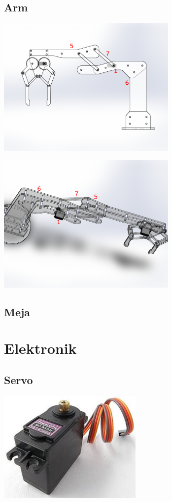 \documentclass[11pt,fleqn]{book} %
\begin{document}
\section{Arm}
\begin{center}
 \includegraphics[width=250pt]{./screenshot/arm/GAF}\\
\end{center}
\begin{center}
 \includegraphics[width=250pt]{./screenshot/arm/GAF1}\\
\end{center}
\section{Meja}

\newpage
{} %
\chapter{Elektronik}
\section{Servo}
\begin{center}
 \includegraphics[width=200pt]{./screenshot/komponen/servo}\\
\end{center}
\end{document}
